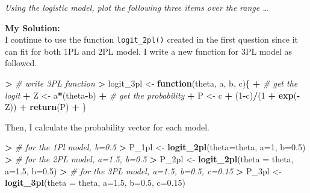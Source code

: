 \documentclass[
]{article}
\newenvironment{Shaded}{\begin{snugshade}}{\end{snugshade}}
\newcommand{\AttributeTok}[1]{\textcolor[rgb]{0.13,0.29,0.53}{#1}}
\newcommand{\CommentTok}[1]{\textcolor[rgb]{0.56,0.35,0.01}{\textit{#1}}}
\newcommand{\ControlFlowTok}[1]{\textcolor[rgb]{0.13,0.29,0.53}{\textbf{#1}}}
\newcommand{\DecValTok}[1]{\textcolor[rgb]{0.00,0.00,0.81}{#1}}
\newcommand{\ErrorTok}[1]{\textcolor[rgb]{0.64,0.00,0.00}{\textbf{#1}}}
\newcommand{\FloatTok}[1]{\textcolor[rgb]{0.00,0.00,0.81}{#1}}
\newcommand{\FunctionTok}[1]{\textcolor[rgb]{0.13,0.29,0.53}{\textbf{#1}}}
\newcommand{\NormalTok}[1]{#1}
\newcommand{\OtherTok}[1]{\textcolor[rgb]{0.56,0.35,0.01}{#1}}
\newcommand{\SpecialCharTok}[1]{\textcolor[rgb]{0.81,0.36,0.00}{\textbf{#1}}}
\begin{document}
\emph{Using the logistic model, plot the following three items over the
range \ldots{}}

\textbf{My Solution: }\\
I continue to use the function \texttt{logit\_2pl()} created in the
first question since it can fit for both 1PL and 2PL model. I write a
new function for 3PL model as followed.

\begin{Shaded}
\begin{Highlighting}[]
\SpecialCharTok{\textgreater{}} \CommentTok{\# write 3PL function}
\ErrorTok{\textgreater{}}\NormalTok{ logit\_3pl }\OtherTok{\textless{}{-}} \ControlFlowTok{function}\NormalTok{(theta, a, b, c)\{}
\SpecialCharTok{+}   \CommentTok{\# get the logit}
\SpecialCharTok{+}\NormalTok{   Z }\OtherTok{\textless{}{-}}\NormalTok{ a}\SpecialCharTok{*}\NormalTok{(theta}\SpecialCharTok{{-}}\NormalTok{b)}
\SpecialCharTok{+}   \CommentTok{\# get the probability}
\SpecialCharTok{+}\NormalTok{   P }\OtherTok{\textless{}{-}}\NormalTok{ c }\SpecialCharTok{+}\NormalTok{ (}\DecValTok{1}\SpecialCharTok{{-}}\NormalTok{c)}\SpecialCharTok{/}\NormalTok{(}\DecValTok{1} \SpecialCharTok{+} \FunctionTok{exp}\NormalTok{(}\SpecialCharTok{{-}}\NormalTok{Z))}
\SpecialCharTok{+}   \FunctionTok{return}\NormalTok{(P)}
\SpecialCharTok{+}\NormalTok{ \}}
\end{Highlighting}
\end{Shaded}

Then, I calculate the probability vector for each model.

\begin{Shaded}
\begin{Highlighting}[]
\SpecialCharTok{\textgreater{}} \CommentTok{\# for the 1Pl model, b=0.5}
\ErrorTok{\textgreater{}}\NormalTok{ P\_1pl }\OtherTok{\textless{}{-}} \FunctionTok{logit\_2pl}\NormalTok{(}\AttributeTok{theta=}\NormalTok{theta, }\AttributeTok{a=}\DecValTok{1}\NormalTok{, }\AttributeTok{b=}\FloatTok{0.5}\NormalTok{)}
\SpecialCharTok{\textgreater{}} \CommentTok{\# for the 2PL model, a=1.5, b=0.5}
\ErrorTok{\textgreater{}}\NormalTok{ P\_2pl }\OtherTok{\textless{}{-}} \FunctionTok{logit\_2pl}\NormalTok{(}\AttributeTok{theta =}\NormalTok{ theta, }\AttributeTok{a=}\FloatTok{1.5}\NormalTok{, }\AttributeTok{b=}\FloatTok{0.5}\NormalTok{)}
\SpecialCharTok{\textgreater{}} \CommentTok{\# for the 3PL model, a=1.5, b=0.5, c=0.15}
\ErrorTok{\textgreater{}}\NormalTok{ P\_3pl }\OtherTok{\textless{}{-}} \FunctionTok{logit\_3pl}\NormalTok{(}\AttributeTok{theta =}\NormalTok{ theta, }\AttributeTok{a=}\FloatTok{1.5}\NormalTok{, }\AttributeTok{b=}\FloatTok{0.5}\NormalTok{, }\AttributeTok{c=}\FloatTok{0.15}\NormalTok{)}
\end{Highlighting}
\end{Shaded}
\end{document}
